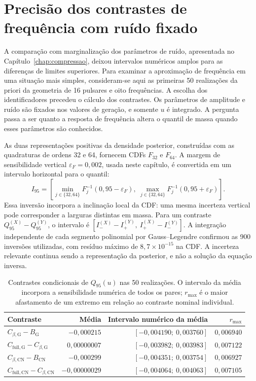 \section{Precisão dos contrastes de frequência com ruído fixado}
\label{sec:contrastes-condicionais}

A comparação com marginalização dos parâmetros de ruído, apresentada
no Capítulo~\ref{chap:compressao}, deixou intervalos numéricos amplos
para as diferenças de limites superiores. Para examinar a aproximação
de frequência em uma situação mais simples, consideram-se aqui as
primeiras 50 realizações da priori da geometria de 16 pulsares e oito
frequências. A escolha dos identificadores precedeu o cálculo dos
contrastes. Os parâmetros de amplitude e ruído são fixados nos valores
de geração, e somente $u$ é integrado. A pergunta passa a ser quanto
a resposta de frequência altera o quantil de massa quando esses
parâmetros são conhecidos.

As duas representações positivas da densidade posterior, construídas
com as quadraturas de ordens 32 e 64, fornecem CDFs $F_{32}$ e $F_{64}$.
A margem de sensibilidade vertical $\varepsilon_F=0{,}002$, usada neste
capítulo, é convertida em um intervalo horizontal para o quantil:
\begin{equation}
 I_{95}=\left[
 \min_{j\in\{32,64\}}F_j^{-1}(0{,}95-\varepsilon_F),\;
 \max_{j\in\{32,64\}}F_j^{-1}(0{,}95+\varepsilon_F)
 \right].
\end{equation}
Essa inversão incorpora a inclinação local da CDF: uma mesma incerteza
vertical pode corresponder a larguras distintas em massa. Para um
contraste $Q^{(X)}_{95}-Q^{(Y)}_{95}$, o intervalo é
$[I^{(X)}_- - I^{(Y)}_+,\ I^{(X)}_+ - I^{(Y)}_-]$.
A integração independente de cada segmento polinomial por
Gauss--Legendre confirmou as 900 inversões utilizadas, com resíduo
máximo de $8{,}7\times10^{-15}$ na CDF. A incerteza relevante continua
sendo a representação da posterior, e não a solução da equação inversa.

\begin{table}[htbp]
\centering
\caption{Contrastes condicionais de $Q_{95}(u)$ nas 50 realizações.
O intervalo da média incorpora a sensibilidade numérica de todos os
pares; $r_{\max}$ é o maior afastamento de um extremo em relação ao
contraste nominal individual.}
\label{tab:contrastes-condicionais}
\small
\begin{tabular}{lrrr}
\toprule
Contraste & Média & Intervalo numérico da média & $r_{\max}$\\
\midrule
$C_{\beta,\mathrm G}-B_{\mathrm G}$ & $-0{,}000215$ & $[-0{,}004190;\ 0{,}003760]$ & $0{,}006940$\\
$C_{\mathrm{full},\mathrm G}-C_{\beta,\mathrm G}$ & $0{,}00000007$ & $[-0{,}003982;\ 0{,}003983]$ & $0{,}007122$\\
$C_{\beta,\mathrm{CN}}-B_{\mathrm{CN}}$ & $-0{,}000299$ & $[-0{,}004351;\ 0{,}003754]$ & $0{,}006927$\\
$C_{\mathrm{full},\mathrm{CN}}-C_{\beta,\mathrm{CN}}$ & $-0{,}00000029$ & $[-0{,}004064;\ 0{,}004063]$ & $0{,}007105$\\
\bottomrule
\end{tabular}
\end{table}

